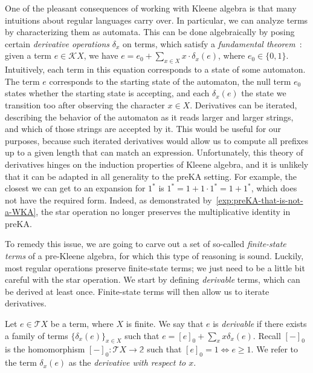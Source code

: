 \documentclass[a4paper,UKenglish,cleveref, autoref, thm-restate]{lipics-v2021}
\begin{document}
One of the pleasant consequences of working with Kleene algebra is that many
intuitions about regular languages carry over.  In particular, we can analyze
terms by characterizing them as automata.  This can be done algebraically by
posing certain \emph{derivative operations} $ \delta _x$ on terms, which satisfy
a \emph{fundamental theorem}~\cite{Silva_2010}: given a term
$e \in \mathcal{K}X$, we have $e = e_0 + \sum _{x \in X} x \cdot \delta _x(e)$,
where $e_0 \in \{0,1\}$.  Intuitively, each term in this equation corresponds to
a state of some automaton.  The term $e$ corresponds to the starting state of
the automaton, the null term $e_0$ states whether the starting state is
accepting, and each $ \delta _x(e)$ the state we transition too after observing
the character $x \in X$.  Derivatives can be iterated, describing the behavior
of the automaton as it reads larger and larger strings, and which of those
strings are accepted by it.  This would be useful for our purposes, because such
iterated derivatives would allow us to compute all prefixes up to a given length
that can match an expression.  Unfortunately, this theory of derivatives hinges
on the induction properties of Kleene algebra, and it is unlikely that it can be
adapted in all generality to the preKA setting.  For example, the closest we can
get to an expansion for $1^*$ is $1^* = 1 + 1 \cdot 1^* = 1 + 1^*$, which does
not have the required form.
Indeed, as demonstrated by~\cref{exp:preKA-that-is-not-a-WKA}, 
the star operation no longer preserves the multiplicative identity in preKA.

To remedy this issue, we are going to carve out a set of so-called
\emph{finite-state terms} of a pre-Kleene algebra, for which this type of
reasoning is sound.  Luckily, most regular operations preserve finite-state
terms; we just need to be a little bit careful with the star operation.  We
start by defining \emph{derivable} terms, which can be derived at least once.
Finite-state terms will then allow us to iterate derivatives.

\begin{definition}
  Let $e  \in  \mathcal{T}X$ be a term, where $X$ is finite.  We say that $e$ is
  \emph{derivable} if there exists a family of terms $\{ \delta _x(e)\}_{x  \in  X}$ such
  that $e = [e]_0 +  \sum _x x \delta _x(e)$.  
  Recall \([-]_0\) is the homomorphism \([-]_0: \mathcal{T}X  \to  \mathbb{2}\) such that \([e]_0 = 1  \iff  e  \geq  1\).
  We refer to the term $ \delta _x(e)$ as the
  \emph{derivative with respect to $x$}.
\end{definition}
\end{document}
